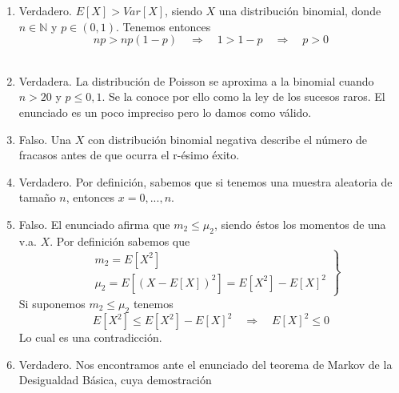 \documentclass[fleqn]{article}
\def\N{\mathds{N}}
\def\next{\quad \Rightarrow \quad}
\begin{document}
\begin{enumerate}
                        \begin{enumerate}
                                \item Verdadero. $E[X] > Var[X]$, siendo $X$ una distribución binomial, donde $n \in \N$ y $ p \in (0,1)$. 
                                        Tenemos entonces
                                        $$np > np(1-p) \next 1>1-p \next p>0$$\\
                                \item Verdadera. La distribución de Poisson se aproxima a la binomial cuando $n>20$ y $p\leq 0,1$. Se la conoce 
                                        por ello como la ley de los sucesos raros. El enunciado es un poco impreciso pero lo damos como válido.\\
                                \item Falso. Una $X$ con distribución binomial negativa describe el número de fracasos antes de que ocurra el 
                                        r-ésimo éxito.\\
                                \item Verdadero. Por definición, sabemos que si tenemos una muestra aleatoria de tamaño $n$, entonces 
                                        $x=0, ... , n$.\\
                                \item Falso. El enunciado afirma que $m_2 \leq \mu_2$, siendo éstos los momentos de una v.a. $X$. Por definición sabemos
                                        que 
                                        $$\left.
                                        \begin{aligned}
                                                &m_2 = E[X^2] \\
                                                &\mu_2 = E[(X- E[X])^2] = E[X^2]- E[X]^2
                                        \end{aligned}
                                        \right\}
                                        $$
                                        Si suponemos $m_2 \leq \mu_2$ tenemos
                                        $$E[X^2] \leq E[X^2] - E[X]^2  \next  E[X]^2 \leq 0$$
                                        Lo cual es una contradicción.\\
                                \item Verdadero. Nos encontramos ante el enunciado del teorema de Markov de la Desigualdad Básica, cuya demostración

\end{enumerate}
\end{enumerate}
\end{document}
